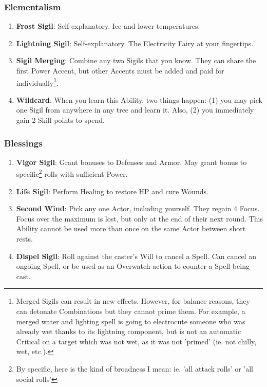 \subsubsection{Elementalism}
\begin{enumerate}
    \item \textbf{Frost Sigil}: Self-explanatory. Ice and lower temperatures.
    \item \textbf{Lightning Sigil}: Self-explanatory. The Electricity Fairy at your fingertips.
    \item \textbf{Sigil Merging}: Combine any two Sigils that you know. They can share the first Power Accent, but other Accents must be added and paid for individually\footnote{Merged Sigils can result in new effects. However, for balance reasons, they can detonate Combinations but they cannot prime them. For example, a merged water and lighting spell is going to electrocute someone who was already wet thanks to its lightning component, but is not an automatic Critical on a target which was not wet, as it was not 'primed' (ie. not chilly, wet, etc.).}.
    \item \textbf{Wildcard}: When you learn this Ability, two things happen: (1) you may pick one Sigil from anywhere in any tree and learn it. Also, (2) you immediately gain 2 Skill points to spend.
\end{enumerate}

\subsubsection{Blessings}
\begin{enumerate}
    \item \textbf{Vigor Sigil}: Grant bonuses to Defenses and Armor. May grant bonus to specific\footnote{By specific, here is the kind of broadness I mean: ie. 'all attack rolls' or 'all social rolls'} rolls with sufficient Power.
    \item \textbf{Life Sigil}: Perform Healing to restore HP and cure Wounds.
    \item \textbf{Second Wind}: Pick any one Actor, including yourself. They regain 4 Focus. Focus over the maximum is lost, but only at the end of their next round. This Ability cannot be used more than once on the same Actor between short rests.
    \item \textbf{Dispel Sigil}: Roll against the caster's Will to cancel a Spell. Can cancel an ongoing Spell, or be used as an Overwatch action to counter a Spell being cast.
\end{enumerate}

